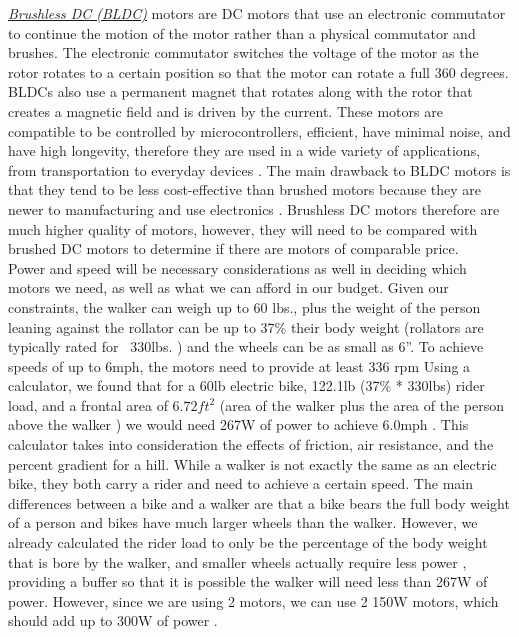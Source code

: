 \noindent \underline{\textit{Brushless DC (BLDC)}} motors are DC motors that use an electronic commutator to continue the motion of the motor rather than a physical commutator and brushes. The electronic commutator switches the voltage of the motor as the rotor rotates to a certain position so that the motor can rotate a full 360 degrees. BLDCs also use a permanent magnet that rotates along with the rotor that creates a magnetic field and is driven by the current. These motors are compatible to be controlled by microcontrollers, efficient, have minimal noise, and have high longevity, therefore they are used in a wide variety of applications, from transportation to everyday devices \cite{elprocus6}. The main drawback to BLDC motors is that they tend to be less cost-effective than brushed motors because they are newer to manufacturing and use electronics \cite{monolithicpower}. Brushless DC motors therefore are much higher quality of motors, however, they will need to be compared with brushed DC motors to determine if there are motors of comparable price. \\

\noindent Power and speed will be necessary considerations as well in deciding which motors we need, as well as what we can afford in our budget. Given our constraints, the walker can weigh up to 60 lbs., plus the weight of the person leaning against the rollator can be up to 37\% \cite{lee2019} their body weight (rollators are typically rated for ~330lbs. \cite{trionic}) and the wheels can be as small as 6”. To achieve speeds of up to 6mph, the motors need to provide at least 336 rpm \cite{spikevm} Using a calculator, we found that for a 60lb electric bike, 122.1lb (37\% * 330lbs) rider load, and a frontal area of $6.72ft^2$ (area of the walker plus the area of the person above the walker \cite{drive}\cite{xconvert}) we would need 267W of power to achieve 6.0mph \cite{gribble}. This calculator takes into consideration the effects of friction, air resistance, and the percent gradient for a hill. While a walker is not exactly the same as an electric bike, they both carry a rider and need to achieve a certain speed. The main differences between a bike and a walker are that a bike bears the full body weight of a person and bikes have much larger wheels than the walker. However, we already calculated the rider load to only be the percentage of the body weight that is bore by the walker, and smaller wheels actually require less power \cite{oxwheels}, providing a buffer so that it is possible the walker will need less than 267W of power. However, since we are using 2 motors, we can use 2 150W motors, which should add up to 300W of power \cite{ebikesforum}. 

